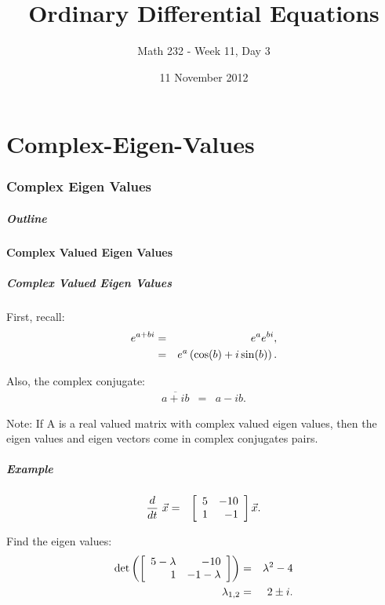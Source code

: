 \part{Complex-Eigen-Values}
\section{Complex Eigen Values}


\title{Ordinary Differential Equations}
\subtitle{Math 232 - Week 11, Day 3}
\date{11 November 2012}

\begin{frame}
  \titlepage
\end{frame}

\begin{frame}
  \frametitle{Outline}
\end{frame}


\subsection{Complex Valued Eigen Values}


\begin{frame}
  \frametitle{Complex Valued Eigen Values}

  First, recall:
  \begin{eqnarray*}
    e^{a+bi} & = & e^a e^{bi}, \\
    & = & e^a \lp \cos(b) + i \sin(b) \rp.
  \end{eqnarray*}

  Also, the complex conjugate:
  \begin{eqnarray*}
    \overline{a+ib} & = & a-i b.
  \end{eqnarray*}

  Note: If A is a real valued matrix with complex valued eigen values,
  then the eigen values and eigen vectors come in complex conjugates
  pairs.

\end{frame}


\begin{frame}
  \frametitle{Example}

  \begin{eqnarray*}
    \deriv{~}{t} \vec{x} & = & \arrayTwo{5}{-10}{1}{-1} \vec{x}.
  \end{eqnarray*}

  {
    Find the eigen values:
    \begin{eqnarray*}
      \det\lp\arrayTwo{5-\lambda}{-10}{1}{-1-\lambda}\rp & = & \lambda^2-4 \\
      \lambda_{1,2} & = & 2 \pm i.
    \end{eqnarray*}
  }

\end{frame}



